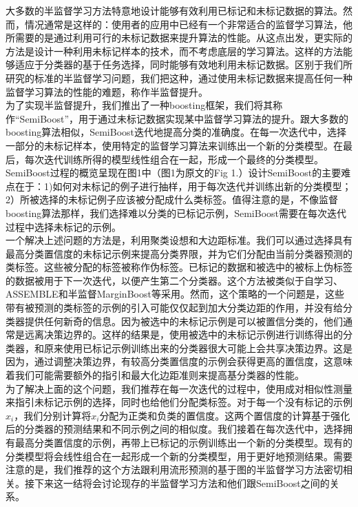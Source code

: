 \documentclass[10pt,journal,compsoc]{IEEEtran}
\begin{document}
大多数的半监督学习方法特意地设计能够有效利用已标记和未标记数据的算法。然而，情况通常是这样的：使用者的应用中已经有一个非常适合的监督学习算法，他所需要的是通过利用可行的未标记数据来提升算法的性能。从这点出发，更实际的方法是设计一种利用未标记样本的技术，而不考虑底层的学习算法。这样的方法能够适应于分类器的基于任务选择，同时能够有效地利用未标记数据。区别于我们所研究的标准的半监督学习问题，我们把这种，通过使用未标记数据来提高任何一种监督学习算法的性能的难题，称作半监督提升。\\
为了实现半监督提升，我们推出了一种boosting框架，我们将其称作“SemiBoost”，用于通过未标记数据实现某中监督学习算法的提升。跟大多数的boosting算法相似，SemiBoost迭代地提高分类的准确度。在每一次迭代中，选择一部分的未标记样本，使用特定的监督学习算法来训练出一个新的分类模型。在最后，每次迭代训练所得的模型线性组合在一起，形成一个最终的分类模型。SemiBoost过程的概览呈现在图1中（图1为原文的Fig 1.）设计SemiBoost的主要难点在于：1)如何对未标记的例子进行抽样，用于每次迭代并训练出新的分类模型；2）所被选择的未标记例子应该被分配成什么类标签。值得注意的是，不像监督boosting算法那样，我们选择难以分类的已标记示例，SemiBoost需要在每次迭代过程中选择未标记的示例。\\
一个解决上述问题的方法是，利用聚类设想和大边距标准。我们可以通过选择具有最高分类置信度的未标记示例来提高分类界限，并为它们分配由当前分类器预测的类标签。这些被分配的标签被称作伪标签。已标记的数据和被选中的被标上伪标签的数据被用于下一次迭代，以便产生第二个分类器。这个方法被类似于自学习、ASSEMBLE和半监督MarginBoost等采用。然而，这个策略的一个问题是，这些带有被预测的类标签的示例的引入可能仅仅起到加大分类边距的作用，并没有给分类器提供任何新奇的信息。因为被选中的未标记示例是可以被置信分类的，他们通常是远离决策边界的。这样的结果是，使用被选中的未标记示例进行训练得出的分类器，和原来使用已标记示例训练出来的分类器很大可能上会共享决策边界。这是因为，通过调整决策边界，有较高分类置信度的示例会获得更高的置信度，这意味着我们可能需要额外的指引和最大化边距准则来提高基分类器的性能。\\
为了解决上面的这个问题，我们推荐在每一次迭代的过程中，使用成对相似性测量来指引未标记示例的选择，同时也给他们分配类标签。对于每一个没有标记的示例$x_i$，我们分别计算将$x_i$分配为正类和负类的置信度。这两个置信度的计算基于强化后的分类器的预测结果和不同示例之间的相似度。我们接着在每次迭代中，选择拥有最高分类置信度的示例，再带上已标记的示例训练出一个新的分类模型。现有的分类模型将会线性组合在一起形成一个新的分类模型，用于更好地预测结果。需要注意的是，我们推荐的这个方法跟利用流形预测的基于图的半监督学习方法密切相关。接下来这一结将会讨论现存的半监督学习方法和他们跟SemiBoost之间的关系。
\end{document}

